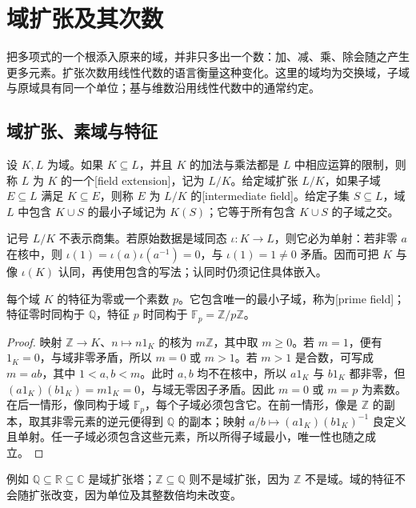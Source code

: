 
\section{域扩张及其次数}
\label{b1:sec:1401}


%
%

把多项式的一个根添入原来的域，并非只多出一个数：加、减、乘、除会随之产生更多元素。扩张次数用线性代数的语言衡量这种变化。这里的域均为交换域，子域与原域具有同一个单位；基与维数沿用线性代数中的通常约定。

\subsection{域扩张、素域与特征}
\label{b1:subsec:1401:01}

\begin{definition}\label{b1:def:field-extension}
	设 \(K,L\) 为域。如果 \(K\subseteq L\)，并且 \(K\) 的加法与乘法都是 \(L\) 中相应运算的限制，则称 \(L\) 为 \(K\) 的一个[field extension]，记为 \(L/K\)。给定域扩张 \(L/K\)，如果子域 \(E\subseteq L\) 满足 \(K\subseteq E\)，则称 \(E\) 为 \(L/K\) 的[intermediate field]。给定子集 \(S\subseteq L\)，域 \(L\) 中包含 \(K\cup S\) 的最小子域记为 \(K(S)\)；它等于所有包含 \(K\cup S\) 的子域之交。
\end{definition}
记号 \(L/K\) 不表示商集。若原始数据是域同态 \(\iota:K\rightarrow L\)，则它必为单射：若非零 \(a\) 在核中，则 \(\iota(1)=\iota(a)\iota(a^{-1})=0\)，与 \(\iota(1)=1\neq0\) 矛盾。因而可把 \(K\) 与像 \(\iota(K)\) 认同，再使用包含的写法；认同时仍须记住具体嵌入。

\begin{proposition}\label{b1:prop:prime-field}
	每个域 \(K\) 的特征为零或一个素数 \(p\)。它包含唯一的最小子域，称为[prime field]；特征零时同构于 \(\mathbb Q\)，特征 \(p\) 时同构于 \(\mathbb F_p=\mathbb Z/p\mathbb Z\)。
\end{proposition}
\begin{proof}
	映射 \(\mathbb Z\rightarrow K\)、\(n\mapsto n1_K\) 的核为 \(m\mathbb Z\)，其中取 \(m\ge0\)。若 \(m=1\)，便有 \(1_K=0\)，与域非零矛盾，所以 \(m=0\) 或 \(m>1\)。若 \(m>1\) 是合数，可写成 \(m=ab\)，其中 \(1<a,b<m\)。此时 \(a,b\) 均不在核中，所以 \(a1_K\) 与 \(b1_K\) 都非零，但 \((a1_K)(b1_K)=m1_K=0\)，与域无零因子矛盾。因此 \(m=0\) 或 \(m=p\) 为素数。在后一情形，像同构于域 \(\mathbb F_p\)，每个子域必须包含它。在前一情形，像是 \(\mathbb Z\) 的副本，取其非零元素的逆元便得到 \(\mathbb Q\) 的副本；映射 \(a/b\mapsto(a1_K)(b1_K)^{-1}\) 良定义且单射。任一子域必须包含这些元素，所以所得子域最小，唯一性也随之成立。
\end{proof}
例如 \(\mathbb Q\subseteq\mathbb R\subseteq\mathbb C\) 是域扩张塔；\(\mathbb Z\subseteq\mathbb Q\) 则不是域扩张，因为 \(\mathbb Z\) 不是域。域的特征不会随扩张改变，因为单位及其整数倍均未改变。

